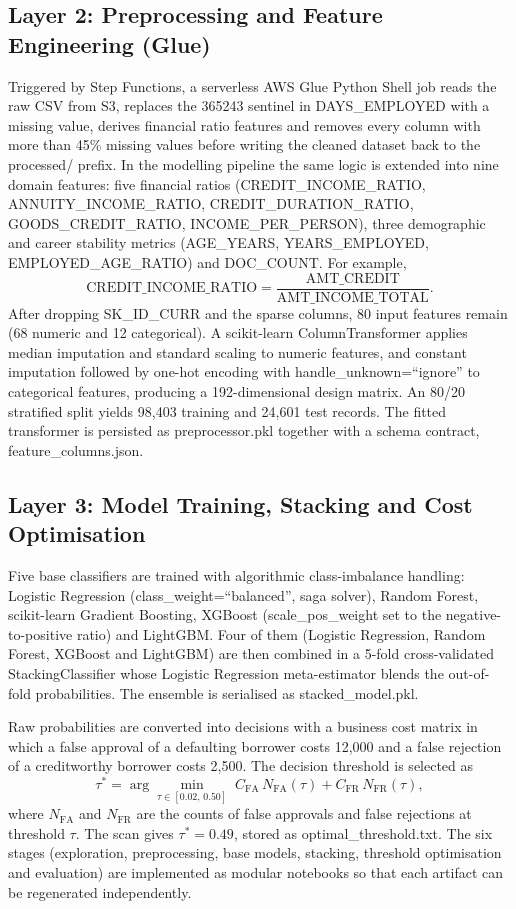 \documentclass[conference]{IEEEtran}
\begin{document}
\subsection{Layer 2: Preprocessing and Feature Engineering (Glue)}
Triggered by Step Functions, a serverless AWS Glue Python Shell job reads the raw CSV from S3, replaces the 365243 sentinel in DAYS\_EMPLOYED with a missing value, derives financial ratio features and removes every column with more than 45\% missing values before writing the cleaned dataset back to the processed/ prefix. In the modelling pipeline the same logic is extended into nine domain features: five financial ratios (CREDIT\_INCOME\_RATIO, ANNUITY\_INCOME\_RATIO, CREDIT\_DURATION\_RATIO, GOODS\_CREDIT\_RATIO, INCOME\_PER\_PERSON), three demographic and career stability metrics (AGE\_YEARS, YEARS\_EMPLOYED, EMPLOYED\_AGE\_RATIO) and DOC\_COUNT. For example,
\begin{equation}
\text{CREDIT\_INCOME\_RATIO} = \frac{\text{AMT\_CREDIT}}{\text{AMT\_INCOME\_TOTAL}}.
\end{equation}
After dropping SK\_ID\_CURR and the sparse columns, 80 input features remain (68 numeric and 12 categorical). A scikit-learn ColumnTransformer applies median imputation and standard scaling to numeric features, and constant imputation followed by one-hot encoding with handle\_unknown=``ignore'' to categorical features, producing a 192-dimensional design matrix. An 80/20 stratified split yields 98,403 training and 24,601 test records. The fitted transformer is persisted as preprocessor.pkl together with a schema contract, feature\_columns.json.

\subsection{Layer 3: Model Training, Stacking and Cost Optimisation}
Five base classifiers are trained with algorithmic class-imbalance handling: Logistic Regression (class\_weight=``balanced'', saga solver), Random Forest, scikit-learn Gradient Boosting, XGBoost (scale\_pos\_weight set to the negative-to-positive ratio) and LightGBM. Four of them (Logistic Regression, Random Forest, XGBoost and LightGBM) are then combined in a 5-fold cross-validated StackingClassifier whose Logistic Regression meta-estimator blends the out-of-fold probabilities. The ensemble is serialised as stacked\_model.pkl.

Raw probabilities are converted into decisions with a business cost matrix in which a false approval of a defaulting borrower costs 12,000 and a false rejection of a creditworthy borrower costs 2,500. The decision threshold is selected as
\begin{equation}
\tau^{*} = \arg\min_{\tau \in [0.02,\,0.50]} \; C_{\mathrm{FA}}\,N_{\mathrm{FA}}(\tau) + C_{\mathrm{FR}}\,N_{\mathrm{FR}}(\tau),
\end{equation}
where $N_{\mathrm{FA}}$ and $N_{\mathrm{FR}}$ are the counts of false approvals and false rejections at threshold $\tau$. The scan gives $\tau^{*} = 0.49$, stored as optimal\_threshold.txt. The six stages (exploration, preprocessing, base models, stacking, threshold optimisation and evaluation) are implemented as modular notebooks so that each artifact can be regenerated independently.
\end{document}

